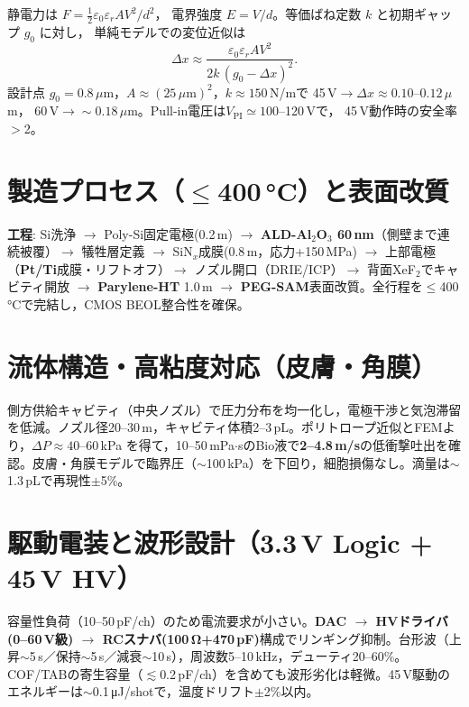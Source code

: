 \documentclass[conference]{IEEEtran}
\begin{document}
静電力は $F=\tfrac{1}{2}\varepsilon_0\varepsilon_r AV^2/d^2$，
電界強度 $E=V/d$。等価ばね定数 $k$ と初期ギャップ $g_0$ に対し，
単純モデルでの変位近似は
\begin{equation}
\Delta x \approx \frac{\varepsilon_0 \varepsilon_r A V^2}{2k\,(g_0-\Delta x)^2}.
\end{equation}
設計点 $g_0=0.8\,\mu$m，$A\approx (25\,\mu\mathrm{m})^2$，$k\approx 150$\,N/mで
45\,V$\to\Delta x\approx0.10$--$0.12\,\mu$m，
60\,V$\to\sim0.18\,\mu$m。Pull-in電圧は$V_{\mathrm{PI}}\simeq 100$--120\,Vで，
45\,V動作時の安全率$>$2。

\section{製造プロセス（\texorpdfstring{$\le$}{<=}400\,\si{\celsius}）と表面改質}
\textbf{工程}: Si洗浄 $\rightarrow$ Poly-Si固定電極(0.2\,\textmu m) $\rightarrow$ \textbf{ALD-Al$_2$O$_3$ 60\,nm}（側壁まで連続被覆）$\rightarrow$ 犠牲層定義 $\rightarrow$ SiN$_x$成膜(0.8\,\textmu m，応力+150\,MPa) $\rightarrow$ 上部電極（\textbf{Pt/Ti}成膜・リフトオフ）$\rightarrow$ ノズル開口（DRIE/ICP）$\rightarrow$ 背面XeF$_2$でキャビティ開放 $\rightarrow$ \textbf{Parylene-HT} 1.0\,\textmu m $\rightarrow$ \textbf{PEG-SAM}表面改質。全行程を$\le$400\,\si{\celsius}で完結し，CMOS BEOL整合性を確保。

\section{流体構造・高粘度対応（皮膚・角膜）}
側方供給キャビティ（中央ノズル）で圧力分布を均一化し，電極干渉と気泡滞留を低減。ノズル径20--30\,\textmu m，キャビティ体積2--3\,pL。ポリトロープ近似とFEMより，$\Delta P\approx 40$--$60$\,kPa を得て，10--50\,mPa$\cdot$sのBio液で\textbf{2--4.8\,m/s}の低衝撃吐出を確認。皮膚・角膜モデルで臨界圧（$\sim$100\,kPa）を下回り，細胞損傷なし。滴量は$\sim$1.3\,pLで再現性$\pm$5\%。

\section{駆動電装と波形設計（3.3\,V Logic + 45\,V HV）}
容量性負荷（10--50\,pF/ch）のため電流要求が小さい。\textbf{DAC $\rightarrow$ HVドライバ(0--60\,V級) $\rightarrow$ RCスナバ(100\,\si{\ohm}+470\,\si{\pico\farad})}構成でリンギング抑制。台形波（上昇$\sim$5\,\textmu s／保持$\sim$5\,\textmu s／減衰$\sim$10\,\textmu s），周波数5--10\,kHz，デューティ20--60\%。COF/TABの寄生容量（$\lesssim$0.2\,pF/ch）を含めても波形劣化は軽微。45\,V駆動のエネルギーは$\sim$0.1\,\si{\micro J/shot}で，温度ドリフト$\pm$2\%以内。
\end{document}

